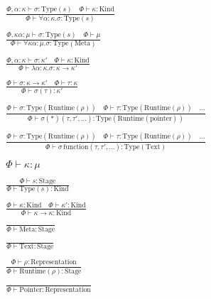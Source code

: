 \documentclass {article}
\begin{document}
\begin{gather*}
\\
\frac
{\Phi, \alpha : \kappa \vdash \sigma : \text{Type}(s) \quad \Phi \vdash \kappa : \text{Kind}}
{\Phi \vdash \forall \alpha : \kappa. \sigma : \text{Type} (s) } \\
\\
\frac
{\Phi, \kappa \alpha : \mu \vdash \sigma : \text{Type} (s) \quad \Phi \vdash \mu  }
{\Phi \vdash \forall \kappa \alpha : \mu. \sigma : \text{Type} (\text{Meta}) } \\
\\
\frac
{\Phi, \alpha : \kappa \vdash \sigma : \kappa' \quad \Phi \vdash \kappa : \text{Kind}} 
{\Phi \vdash \lambda \alpha : \kappa. \sigma : \kappa \to \kappa' } \\
\\
\frac
{\Phi \vdash \sigma : \kappa \to \kappa' \quad \Phi \vdash \tau : \kappa}
{\Phi \vdash \sigma (\tau) : \kappa' } \\
\\
\frac
{\Phi \vdash \sigma : \text{Type} (\text{Runtime} (\rho)) \quad \Phi \vdash \tau : \text{Type} (\text{Runtime} (\rho)) \quad \dots}
{\Phi \vdash \sigma (*) (\tau, \tau', \dots) : \text{Type} (\text{Runtime} (\text{pointer}))} \\
\\
\frac
{\Phi \vdash \sigma : \text{Type} (\text{Runtime} (\rho)) \quad \Phi \vdash \tau : \text{Type} (\text{Runtime} (\rho)) \quad \dots}
{\Phi \vdash \sigma \, \text{function} (\tau, \tau', \dots) : \text{Type} (\text{Text})} \\
\\
\Phi \vdash \kappa : \mu \tag*{[Kind Validation]} \\
\\
\frac
{\Phi \vdash s : \text{Stage}}
{\Phi \vdash \text {Type} (s) : \text{Kind}} \\
\\
\frac
{\Phi \vdash \kappa : \text{Kind} \quad \Phi \vdash \kappa' : \text{Kind}}
{\Phi \vdash \kappa \to \kappa : \text{Kind} } \\
\\
\frac
{}
{\Phi \vdash \text{Meta} : \text{Stage}} \\
\\
\frac
{}
{\Phi \vdash \text{Text} : \text{Stage}} \\
\\
\frac
{\Phi \vdash \rho : \text{Representation}}
{\Phi \vdash \text{Runtime} (\rho) : \text{Stage}} \\
\\
\frac
{}
{\Phi \vdash \text{Pointer} : \text{Representation}} \\
\\
\end{gather*}
\end{document}
